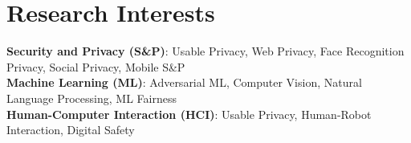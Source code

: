 \section{Research Interests}
 \begin{itemize}[leftmargin=0.5cm, label={}]
    \small{\item{
     \textbf{Security and Privacy (S\&P)}{: Usable Privacy, Web Privacy, Face Recognition Privacy, Social Privacy, Mobile S\&P} \\
     \textbf{Machine Learning (ML)}{: Adversarial ML, Computer Vision, Natural Language Processing, ML Fairness} \\
     \textbf{Human-Computer Interaction (HCI)}{: Usable Privacy, Human-Robot Interaction, Digital Safety} \\
    }}
 \end{itemize}